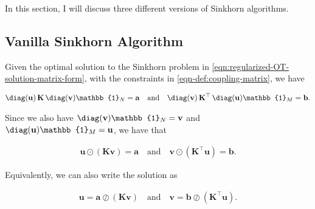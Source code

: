 
In this section, I will discuss three different versions of Sinkhorn algorithms.





















\subsection{Vanilla Sinkhorn Algorithm}\label{subsec:vanilla-sinkhorn}

Given the optimal solution to the Sinkhorn problem in \cref{eqn:regularized-OT-solution-matrix-form},
with the constraints in \cref{eqn-def:coupling-matrix}, we have

\begin{equation}
  \begin{aligned}
    \diag(\mathbf{u}) \,  \mathbf{K}      \, \diag(\mathbf{v}) \mathbb{1}_N  = \mathbf{a}
    \quad\text{and}\quad
    \diag(\mathbf{v}) \,  \mathbf{K}^\top \, \diag(\mathbf{u}) \mathbb{1}_M  = \mathbf{b}.
  \end{aligned}
\end{equation}

Since we also have $\diag(\mathbf{v}) \mathbb{1}_N = \mathbf{v}$ and $\diag(\mathbf{u}) \mathbb{1}_M = \mathbf{u}$,
we have that

\begin{equation}\label{eqn:vanilla-sinkhorn-solution-multiply}
  \begin{aligned}
    \mathbf{u} \odot (\mathbf{K} \mathbf{v}) = \mathbf{a}
    \quad\text{and}\quad
    \mathbf{v} \odot (\mathbf{K}^\top \mathbf{u}) = \mathbf{b}.
  \end{aligned}
\end{equation}

Equivalently, we can also write the solution as

\begin{equation}\label{eqn:vanilla-sinkhorn-solution-division}
  \begin{aligned}
    \mathbf{u} = \mathbf{a} \oslash (\mathbf{K} \mathbf{v})
    \quad\text{and}\quad
    \mathbf{v} = \mathbf{b} \oslash (\mathbf{K}^\top \mathbf{u}).
  \end{aligned}
\end{equation}

